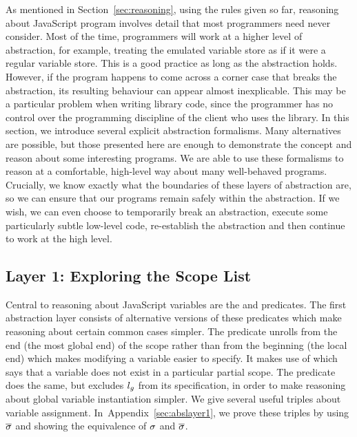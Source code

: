 \documentclass{article}
\newcommand{\iflong}[1]{#1}
\newcommand{\ifshort}[1]{}
\begin{document}
As mentioned in Section~\ref{sec:reasoning}, using the rules given so
far, reasoning about JavaScript program involves 
detail that most programmers need never consider. Most of the time,
programmers will work at a higher level of abstraction, for example,
treating the emulated variable store as if it were a regular variable
store. This is a good practice as  long as the abstraction holds.
However, if the program happens to come across a corner case that
breaks the abstraction, its resulting behaviour can appear almost
inexplicable. This may be a particular problem when writing library
code, since the programmer has no control over the programming
discipline of the client who uses the library. In this section,  we
introduce several  explicit abstraction formalisms. Many alternatives 
are possible, but those presented here are enough to demonstrate the
concept and reason about some interesting programs. We are able to use
these formalisms to reason at a comfortable, high-level way 
about many well-behaved programs. Crucially, we know exactly what the
boundaries of these layers of abstraction are, so we can ensure that
our programs remain safely within the abstraction. If we wish, we can
even choose to temporarily break an abstraction, execute some
particularly subtle low-level code, re-establish the abstraction and then 
continue to work at the high level.


\subsection{Layer 1: Exploring the Scope List}
\label{sec:layer1}

Central to reasoning about JavaScript variables are the \scope and
\proto predicates. The first abstraction layer consists of alternative
versions of these predicates which make reasoning about certain common
cases simpler. The \scopepr predicate unrolls from the end (the most
global end) of the scope rather than from the beginning (the local
end) which makes modifying a variable easier to specify. It makes use
of \notscope which says that a variable does not exist in a particular
partial scope. The \notscopeg predicate does the same, but excludes
$l_g$ from its specification, in order to make reasoning about global
variable instantiation simpler. We give several useful triples about
variable assignment. In~\ifshort{\cite{proofs}}\iflong{Appendix~\ref{sec:abslayer1}},  we prove these triples by using  $\overline{\sigma}$  and showing the equivalence of $\sigma$ and
$\overline{\sigma}$.
\end{document}
